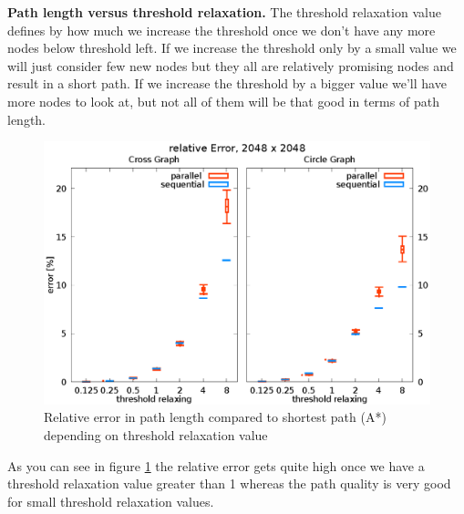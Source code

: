 \documentclass[letterpaper]{article}
\newcommand{\mypar}[1]{{\bf #1.}}
\begin{document}
\mypar{Path length versus threshold relaxation}
The threshold relaxation value defines by how much we increase the threshold once we don't have any more nodes below threshold left. If we increase the threshold only by a small value we will just consider few new nodes but they all are relatively promising nodes and result in a short path. If we increase the threshold by a bigger value we'll have more nodes to look at, but not all of them will be that good in terms of path length.
\begin{figure}[h]\centering
  \includegraphics[scale=0.558]{error_threshold.eps}
  \caption{Relative error in path length compared to shortest path (A*) depending on threshold relaxation value\label{fig:error_thresh}}
\end{figure}
As you can see in figure \ref{fig:error_thresh} the relative error gets quite high once we have a threshold relaxation value greater than 1 whereas the path quality is very good for small threshold relaxation values.
\end{document}
